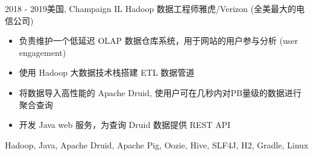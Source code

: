 \begin{experiences}
\experience
{2018 - 2019}{美国, Champaign IL}
{Hadoop 数据工程师}{雅虎/Verizon (全美最大的电信公司)}
{
    \begin{itemize}
    \item 负责维护一个低延迟 OLAP 数据仓库系统，用于网站的用户参与分析 (user engagement)
    \item 使用 Hadoop 大数据技术栈搭建 ETL 数据管道
    \item 将数据导入高性能的 Apache Druid, 使用户可在几秒内对PB量级的数据进行聚合查询
    \item 开发 Java web 服务，为查询 Druid 数据提供 REST API
    \end{itemize}
}
{Hadoop, Java, Apache Druid, Apache Pig, Oozie, Hive, SLF4J, H2, Gradle, Linux}

\end{experiences}
